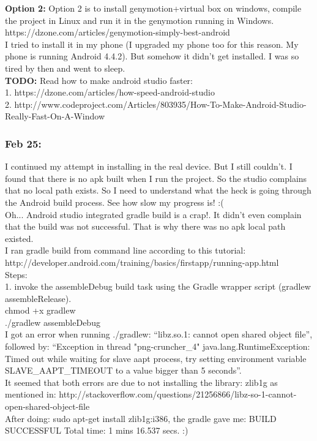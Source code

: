 \documentclass[11pt]{article}
\begin{document}
\textbf{Option 2: } Option 2 is to install genymotion+virtual box on windows, compile the project in Linux and run it in the genymotion 
running in Windows. https://dzone.com/articles/genymotion-simply-best-android \\

I tried to install it in my phone (I upgraded my phone too for this reason. My phone is running Android 4.4.2). But somehow it didn't get installed.
I was so tired by then and went to sleep.\\

\textbf{TODO:}
Read how to make android studio faster:\\
1. https://dzone.com/articles/how-speed-android-studio\\
2. http://www.codeproject.com/Articles/803935/How-To-Make-Android-Studio-Really-Fast-On-A-Window\\


\subsubsection*{Feb 25:}
I continued my attempt in installing in the real device. But I still couldn't.
I found that there is no apk built when I run the project. So the studio complains that no local path exists. So I need to understand what the heck 
is going through the Android build process. See how slow my progress is! :(\\

Oh... Android studio integrated gradle build is a crap!. It didn't even complain that the build was not successful. That is why there was no apk 
local path existed.\\

I ran gradle build from command line according to this tutorial: http://developer.android.com/training/basics/firstapp/running-app.html\\
Steps: \\
1. invoke the assembleDebug build task using the Gradle wrapper script (gradlew assembleRelease).\\
chmod +x gradlew\\
./gradlew assembleDebug\\

I got an error when running ./gradlew: ``libz.so.1: cannot open shared object file'', followed by: ``Exception in thread "png-cruncher\_4" 
java.lang.RuntimeException: Timed out while waiting for slave aapt process, try setting environment variable SLAVE\_AAPT\_TIMEOUT to a value bigger 
than 5 seconds''.\\
It seemed that both errors are due to not installing the library: zlib1g as mentioned in: 
http://stackoverflow.com/questions/21256866/libz-so-1-cannot-open-shared-object-file\\
After doing: sudo apt-get install zlib1g:i386, the gradle gave me: BUILD SUCCESSFUL Total time: 1 mins 16.537 secs. :)\\
\end{document}
